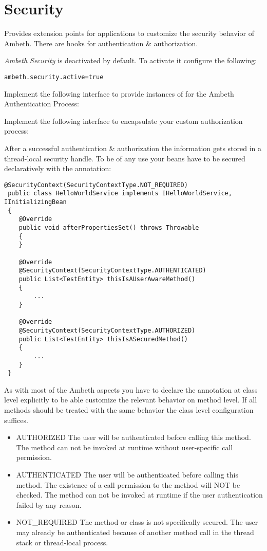 \section{Security}
\label{module:Security}

Provides extension points for applications to customize the security behavior of Ambeth. There are hooks for authentication \& authorization.

\textit{Ambeth Security} is deactivated by default. To activate it configure the following:
\begin{lstlisting}[style=Props]
ambeth.security.active=true
\end{lstlisting}

Implement the following interface to provide instances of  for the Ambeth Authentication Process:

Implement the following interface to encapsulate your custom authorization process:

After a successful authentication \& authorization the information gets stored in a thread-local security handle. To be of any use your beans have to be secured declaratively with the  annotation:

\begin{lstlisting}[style=Java]
@SecurityContext(SecurityContextType.NOT_REQUIRED)
 public class HelloWorldService implements IHelloWorldService, IInitializingBean
 {
 	@Override
 	public void afterPropertiesSet() throws Throwable
 	{
 	}
 
 	@Override
 	@SecurityContext(SecurityContextType.AUTHENTICATED)
 	public List<TestEntity> thisIsAUserAwareMethod()
 	{
 		...
 	}
 
 	@Override
 	@SecurityContext(SecurityContextType.AUTHORIZED)
 	public List<TestEntity> thisIsASecuredMethod()
 	{
 		...
 	}
 }
\end{lstlisting}
As with most of the Ambeth aspects you have to declare the annotation at class level explicitly to be able customize the relevant behavior on method level. If all methods should be treated with the same behavior the class level configuration suffices.

\begin{itemize}
	\item AUTHORIZED The user will be authenticated before calling this method. The method can not be invoked at runtime without user-specific call permission.
	\item AUTHENTICATED The user will be authenticated before calling this method. The existence of a call permission to the method will NOT be checked. The method can not be invoked at runtime if the user authentication failed by any reason.
	\item NOT\_REQUIRED The method or class is not specifically secured. The user may already be authenticated because of another method call in the thread stack or thread-local process.
\end{itemize}


